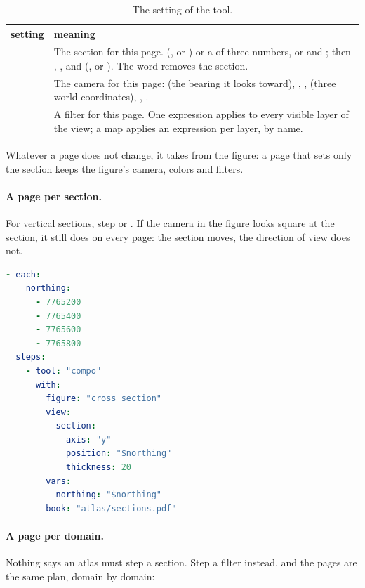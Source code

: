 \begin{table}[htbp]\small
\begin{tabularx}{\linewidth}{@{}lL@{}}\toprule
setting & meaning \\ \midrule
{} & The section for this page.  (,  or ) or a  of three numbers, or  and ; then , , and  (,  or ). The word  removes the section. \\
 & The camera for this page:  (the bearing it looks toward), , ,  (three world coordinates), , . \\
 & A filter for this page. One expression applies to every visible layer of the view; a map applies an expression per layer, by name. \\ \bottomrule
\end{tabularx}
\caption{The  setting of the  tool.}\label{tab:atlas-view}
\end{table}

Whatever a page does not change, it takes from the figure: a page that sets only the section keeps the figure's camera, colors and filters.

\paragraph{A page per section.} For vertical sections, step  or . If the camera in the figure looks square at the section, it still does on every page: the section moves, the direction of view does not.

\begin{lstlisting}[language=yaml]
- each:
    northing:
      - 7765200
      - 7765400
      - 7765600
      - 7765800
  steps:
    - tool: "compo"
      with:
        figure: "cross section"
        view:
          section:
            axis: "y"
            position: "$northing"
            thickness: 20
        vars:
          northing: "$northing"
        book: "atlas/sections.pdf"
\end{lstlisting}

\paragraph{A page per domain.} Nothing says an atlas must step a section. Step a filter instead, and the pages are the same plan, domain by domain:

